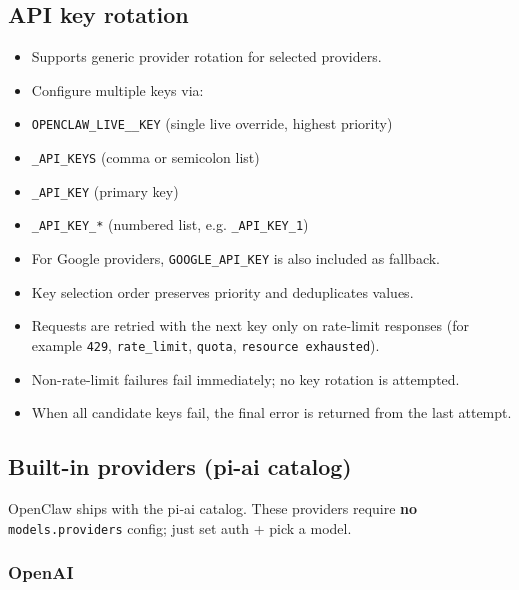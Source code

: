 \subsection{API key rotation}


\begin{itemize}
  \item Supports generic provider rotation for selected providers.
  \item Configure multiple keys via:
  \item \texttt{OPENCLAW\_LIVE\_\_KEY} (single live override, highest priority)
  \item \texttt{\_API\_KEYS} (comma or semicolon list)
  \item \texttt{\_API\_KEY} (primary key)
  \item \texttt{\_API\_KEY\_*} (numbered list, e.g. \texttt{\_API\_KEY\_1})
  \item For Google providers, \texttt{GOOGLE\_API\_KEY} is also included as fallback.
  \item Key selection order preserves priority and deduplicates values.
  \item Requests are retried with the next key only on rate-limit responses (for example \texttt{429}, \texttt{rate\_limit}, \texttt{quota}, \texttt{resource exhausted}).
  \item Non-rate-limit failures fail immediately; no key rotation is attempted.
  \item When all candidate keys fail, the final error is returned from the last attempt.
\end{itemize}


\subsection{Built-in providers (pi-ai catalog)}


OpenClaw ships with the pi‑ai catalog. These providers require \textbf{no}
\texttt{models.providers} config; just set auth + pick a model.

\subsubsection{OpenAI}


